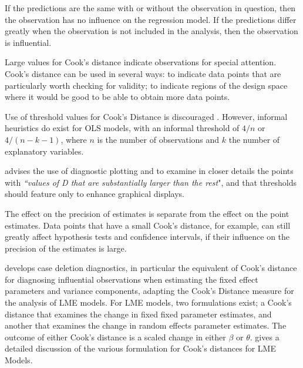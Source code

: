 \documentclass[12pt, a4paper]{report}
\theoremstyle{plain}
\theoremstyle{definition}
\theoremstyle{remark}
\begin{document}
If the predictions are the same with or without the observation in question, then the observation has no influence on the regression model. If the predictions differ greatly when the observation is not included in the analysis, then the observation is influential.
	
Large values for Cook's distance indicate observations for special attention. Cook's distance can be used in several ways: to indicate data points that are particularly worth checking for validity; to indicate regions of the design space where it would be good to be able to obtain more data points.
	
Use of threshold values for Cook's Distance is discouraged \citep{fox1991}. However, informal heuristics do exist for OLS models, with an informal threshold of $4/n$ or $4/(n-k-1)$, where $n$ is the number of observations and $k$ the number of explanatory variables.

\citet{fox1991} advises the use of diagnostic plotting and to examine in closer details the points with \textit{``values of D that are substantially larger than the rest}", and that thresholds should feature only to enhance graphical displays.
	
The effect on the precision of estimates is separate from the effect on the point estimates. Data points that have a small Cook's distance, for example, can still greatly affect hypothesis tests and confidence intervals, if their  influence on the precision of the estimates is large.
	
	
	\citet{Christensen} develops  case deletion diagnostics, in particular the equivalent of  Cook's distance for diagnosing influential observations when estimating the fixed effect parameters and variance components, adapting the Cook's Distance measure for the analysis of LME models. For LME models, two formulations exist; a Cook's distance that examines the change in fixed fixed parameter estimates, and another that examines the change in random effects parameter estimates. The outcome of either Cook's distance is a scaled change in either $\beta$ or $\theta$. \citet{Zewotir} gives a detailed discussion of the various formulation for Cook's distances for LME Models.
	
\end{document}

